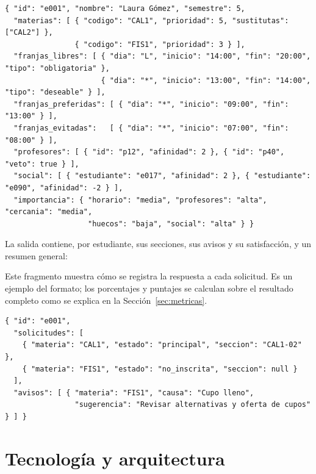 \documentclass[pdflatex,sn-mathphys-num]{sn-jnl}%
\begin{document}
\begin{minipage}{\textwidth}
\begin{lstlisting}[style=json]
{ "id": "e001", "nombre": "Laura Gómez", "semestre": 5,
  "materias": [ { "codigo": "CAL1", "prioridad": 5, "sustitutas": ["CAL2"] },
                { "codigo": "FIS1", "prioridad": 3 } ],
  "franjas_libres": [ { "dia": "L", "inicio": "14:00", "fin": "20:00", "tipo": "obligatoria" },
                      { "dia": "*", "inicio": "13:00", "fin": "14:00", "tipo": "deseable" } ],
  "franjas_preferidas": [ { "dia": "*", "inicio": "09:00", "fin": "13:00" } ],
  "franjas_evitadas":   [ { "dia": "*", "inicio": "07:00", "fin": "08:00" } ],
  "profesores": [ { "id": "p12", "afinidad": 2 }, { "id": "p40", "veto": true } ],
  "social": [ { "estudiante": "e017", "afinidad": 2 }, { "estudiante": "e090", "afinidad": -2 } ],
  "importancia": { "horario": "media", "profesores": "alta", "cercania": "media",
                   "huecos": "baja", "social": "alta" } }
\end{lstlisting}
\end{minipage}


La salida contiene, por estudiante, sus secciones, sus avisos y su satisfacción, y un resumen general:

Este fragmento muestra cómo se registra la respuesta a cada solicitud. Es un ejemplo del formato; los porcentajes y puntajes se calculan sobre el resultado completo como se explica en la Sección~\ref{sec:metricas}.

\begin{minipage}{\textwidth}
\begin{lstlisting}[style=json]
{ "id": "e001",
  "solicitudes": [
    { "materia": "CAL1", "estado": "principal", "seccion": "CAL1-02" },
    { "materia": "FIS1", "estado": "no_inscrita", "seccion": null }
  ],
  "avisos": [ { "materia": "FIS1", "causa": "Cupo lleno",
                "sugerencia": "Revisar alternativas y oferta de cupos" } ] }
\end{lstlisting}
\end{minipage}




\section{Tecnología y arquitectura}\label{sec:tec}
\end{document}
